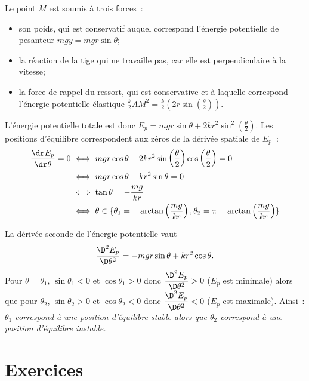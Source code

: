 Le point $M$ est soumis à trois forces~:
\begin{itemize}
\item son poids, qui est conservatif auquel correspond l'énergie potentielle de pesanteur $mgy=mgr\sin\theta$;
\item la réaction de la tige qui ne travaille pas, car elle est perpendiculaire à la vitesse;
\item la force de rappel du ressort, qui est conservative et à laquelle correspond l'énergie potentielle élastique $\frac{k}{2}AM^2=\frac{k}{2}\left(2r\sin\left(\frac{\theta}{2}\right)\right)$.
\end{itemize}

L'énergie potentielle totale est donc $E_p = mgr \sin\theta + 2kr^2 \sin^2\left(\frac{\theta}{2}\right)$. Les positions d'équilibre correspondent aux zéros de la dérivée spatiale de $E_p$~:
\begin{align}
  \derivep{E_p}{\theta} = 0 &\iff mgr\cos\theta +2kr^2 \sin\left(\frac{\theta}{2}\right) \cos\left(\frac{\theta}{2}\right)=0 \\
&\iff mgr\cos\theta + kr^2 \sin\theta=0\\
&\iff \tan\theta = -\frac{mg}{kr}\\
&\iff \theta \in \{\theta_1=-\arctan \left( \frac{mg}{kr} \right), \theta_2=\pi-\arctan \left( \frac{mg}{kr} \right)\}
\end{align}

La dérivée seconde de l'énergie potentielle vaut
\begin{equation}
  \deriveds{E_p}{\theta} = -mgr\sin\theta +kr^2\cos\theta.
\end{equation}
Pour $\theta=\theta_1$, $\sin\theta_1<0$ et $\cos\theta_1>0$ donc $\deriveds{E_p}{\theta}>0$ ($E_p$ est minimale) alors que pour $\theta_2$, $\sin\theta_2>0$ et $\cos\theta_2<0$ donc $\deriveds{E_p}{\theta}<0$ ($E_p$ est maximale). Ainsi~: \emph{$\theta_1$ correspond à une position d'équilibre stable alors que $\theta_2$ correspond à une position d'équilibre instable.}

\section{Exercices}
\label{chap4-sec:exercices}


